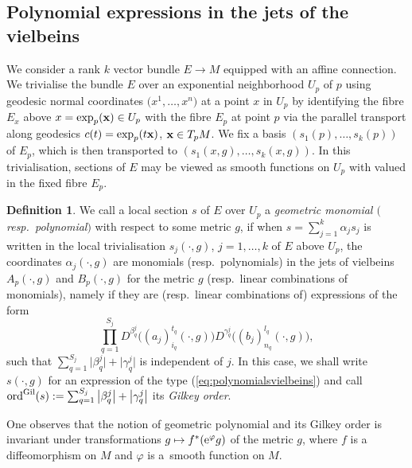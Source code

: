 \documentclass[10pt,a4paper]{amsart}
\numberwithin{equation}{section}
\theoremstyle{definition}
\newtheorem{defn}[thm]{Definition}
\begin{document}
\subsection{Polynomial expressions in the jets of the vielbeins}

We consider a rank $k$ vector bundle $E\to M$ equipped with an affine connection. We trivialise the bundle $E$ over an exponential neighborhood $U_p$ of $p$ using geodesic normal coordinates $\bigl(x^1, \dots, x^n\bigr)$ at a point $x$ in $U_p$ by identifying the fibre $E_x$ above $x=\exp_p( {\bf x})\in U_p$ with the fibre $E_p$ at point $p$ via the parallel transport along geodesics $c(t)=\exp_p(t \bf x)$, ${\bf x}\in T_pM$. We fix a basis $(s_1(p), \dots, s_k(p))$ of $E_p$, which is then transported to $(s_1(x,g), \dots, s_k(x, g))$. In this trivialisation, sections of $E$ may be viewed as smooth functions on $U_p$ with valued in the fixed fibre $E_p$.
\begin{defn}\label{defn:geometricpolE}
We call a local section $s$ of $E$ over $U_p$ a {\it geometric monomial $($resp.\ polynomial$)$} with respect to some metric $g$, if when $s=\sum_{j=1}^k \alpha_j s_j$ is written in the local trivialisation $s_j(\cdot, g)$, $j=1, \dots, k$ of $E$ above $U_p$, the coordinates $\alpha_j(\cdot,g)$ are monomials (resp.\ polynomials) in the jets of vielbeins $A_p(\cdot,g)$ and $B_p(\cdot,g)$ for the metric $g$ (resp.\ linear combinations of monomials), namely if they are (resp.\ linear combinations of) expressions of the form
\begin{equation}\label{eq:polynomialsvielbeins}
\prod_{q=1}^{S_j} D^{\beta_{q}^j}\bigl((a_j)_{i_q}^{t_q}(\cdot,g)\bigr) D^{\gamma_q^j}\bigl((b_j)^{l_q}_{n_q}(\cdot,g)\bigr),
\end{equation}
such that $\sum_{q=1}^{S_j}\big\vert \beta_q^j\big\vert +\big\vert \gamma_q^j\big\vert$ is independent of $j$. In this case, we shall write $ s(\cdot,g)$ for an expression of the type (\ref{eq:polynomialsvielbeins}) and call ${\rm ord}^{\rm Gil}( s):=\sum_{q=1}^{S_j}\big\vert \beta_q^j\big\vert +\big\vert \gamma_q^j\big\vert$ its {\it Gilkey order}.
\end{defn}

One observes that the notion of geometric polynomial and its Gilkey order is invariant under transformations $g\mapsto f^*({\rm e}^\varphi g)$ of the metric $g$, where $f$ is a diffeomorphism on $M$ and $\varphi $ is a~smooth function on $M$.
\end{document}

